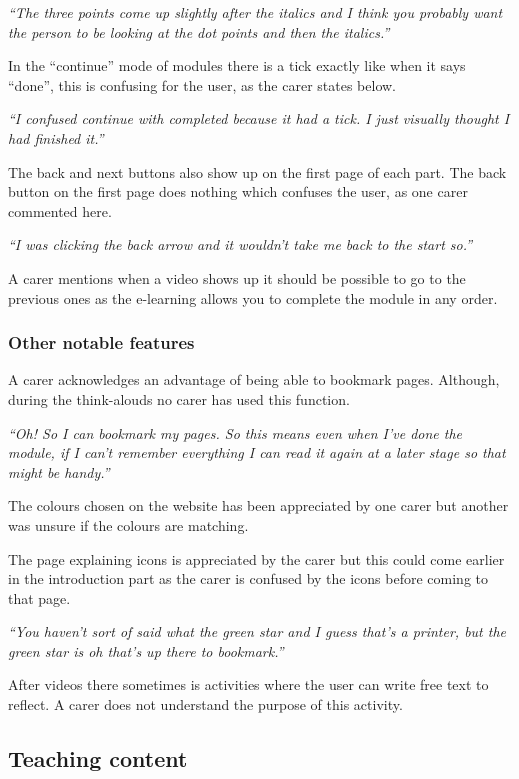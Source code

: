 \documentclass{sigchi}
\begin{document}
\textit{“The three points come up slightly after the italics and I think you probably want the person to be looking at the dot points and then the italics.”}

In the “continue” mode of modules there is a tick exactly like when it says “done”, this is confusing for the user, as the carer states below. 

\textit{“I confused continue with completed because it had a tick. I just visually thought I had finished it.”}

The back and next buttons also show up on the first page of each part. The back button on the first page does nothing which confuses the user, as one carer commented here.

\textit{“I was clicking the back arrow and it wouldn't take me back to the start so.”}

A carer mentions when a video shows up it should be possible to go to the previous ones as the e-learning allows you to complete the module in any order.

\subsubsection{Other notable features}
A carer acknowledges an advantage of being able to bookmark pages. Although, during the think-alouds no carer has used this function. 

\textit{“Oh! So I can bookmark my pages. So this means even when I’ve done the module, if I can’t remember everything I can read it again at a later stage so that might be handy.”}

The colours chosen on the website has been appreciated by one carer but another was unsure if the colours are matching. 

The page explaining icons is appreciated by the carer but this could come earlier in the introduction part as the carer is confused by the icons before coming to that page.

\textit{“You haven’t sort of said what the green star and I guess that’s a printer, but the green star is oh that’s up there to bookmark.”}

After videos there sometimes is activities where the user can write free text to reflect. A carer does not understand the purpose of this activity. 

\subsection{Teaching content}
\end{document}
